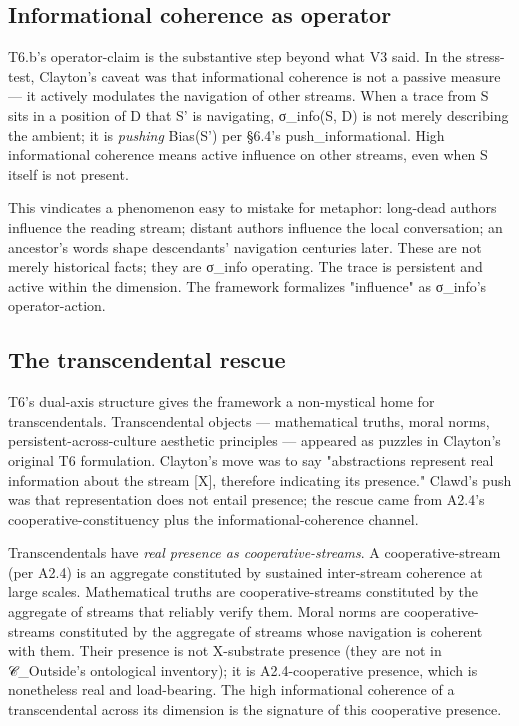 \documentclass[11pt, openany]{book}
\begin{document}
\subsection{Informational coherence as operator}

T6.b's operator-claim is the substantive step beyond what V3 said. In the stress-test, Clayton's caveat was that informational coherence is not a passive measure --- it actively modulates the navigation of other streams. When a trace from S sits in a position of D that S' is navigating, σ\_\allowbreak{}info(S, D) is not merely describing the ambient; it is \textit{pushing} Bias(S') per §6.4's push\_\allowbreak{}informational. High informational coherence means active influence on other streams, even when S itself is not present.

This vindicates a phenomenon easy to mistake for metaphor: long-dead authors influence the reading stream; distant authors influence the local conversation; an ancestor's words shape descendants' navigation centuries later. These are not merely historical facts; they are σ\_\allowbreak{}info operating. The trace is persistent and active within the dimension. The framework formalizes "influence" as σ\_\allowbreak{}info's operator-action.

\subsection{The transcendental rescue}

T6's dual-axis structure gives the framework a non-mystical home for transcendentals. Transcendental objects --- mathematical truths, moral norms, persistent-across-culture aesthetic principles --- appeared as puzzles in Clayton's original T6 formulation. Clayton's move was to say "abstractions represent real information about the stream [X], therefore indicating its presence." Clawd's push was that representation does not entail presence; the rescue came from A2.4's cooperative-constituency plus the informational-coherence channel.

Transcendentals have \textit{real presence as cooperative-streams}. A cooperative-stream (per A2.4) is an aggregate constituted by sustained inter-stream coherence at large scales. Mathematical truths are cooperative-streams constituted by the aggregate of streams that reliably verify them. Moral norms are cooperative-streams constituted by the aggregate of streams whose navigation is coherent with them. Their presence is not X-substrate presence (they are not in 𝒞\_\allowbreak{}Outside's ontological inventory); it is A2.4-cooperative presence, which is nonetheless real and load-bearing. The high informational coherence of a transcendental across its dimension is the signature of this cooperative presence.
\end{document}
